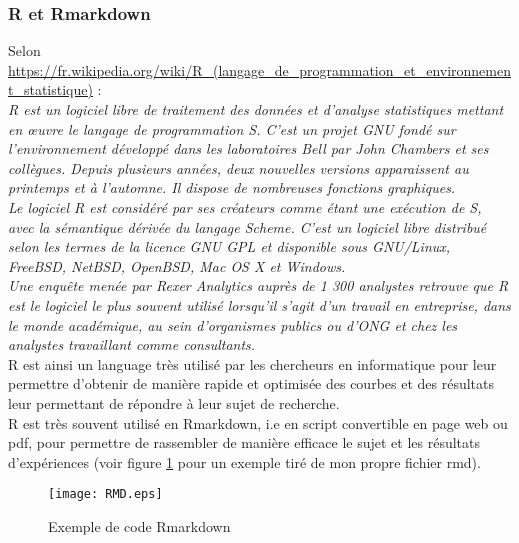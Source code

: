 \documentclass[a4paper,12pt]{article}
\begin{document}
{{	\subsubsection{R et Rmarkdown}
	\indent Selon \url{https://fr.wikipedia.org/wiki/R_(langage_de_programmation_et_environnement_statistique)} :\\
	\textit{R est un logiciel libre de traitement des donn\'e{}es et d'analyse statistiques mettant en \oe{}uvre le langage de programmation S. C'est un projet GNU fond\'e sur l'environnement d\'e{}velopp\'e dans les laboratoires Bell par John Chambers et ses coll\`egues. Depuis plusieurs ann\'e{}es, deux nouvelles versions apparaissent au printemps et à l'automne. Il dispose de nombreuses fonctions graphiques.\\
Le logiciel R est consid\'e{}r\'e par ses cr\'e{}ateurs comme \'e{}tant une ex\'e{}cution de S, avec la s\'e{}mantique d\'e{}riv\'e{}e du langage Scheme. C'est un logiciel libre distribu\'e{} selon les termes de la licence GNU GPL et disponible sous GNU/Linux, FreeBSD, NetBSD, OpenBSD, Mac OS X et Windows.\\
Une enqu\^ete men\'e{}e par Rexer Analytics aupr\`es de 1 300 analystes retrouve que R est le logiciel le plus souvent utilis\'e{} lorsqu'il s'agit d'un travail en entreprise, dans le monde acad\'e{}mique, au sein d'organismes publics ou d'ONG et chez les analystes travaillant comme consultants.}\\
    \indent R est ainsi un language tr\`es utilis\'e par les chercheurs en informatique pour leur permettre d'obtenir de mani\`ere rapide et optimis\'e{}e des courbes et des r\'e{}sultats leur permettant de r\'e{}pondre \`a leur sujet de recherche. \\
    R est tr\`es souvent utilis\'e en Rmarkdown, i.e en script convertible en page web ou pdf, pour permettre de rassembler de manière efficace le sujet et les r\'e{}sultats d'exp\'e{}riences (voir figure \ref{fig:rmd} pour un exemple tir\'e{} de mon propre fichier rmd).~
	\begin{figure}[!ht]
	    \centering
	    \caption{Exemple de code Rmarkdown}
	    \label{fig:rmd}
	    \texttt{[image: RMD.eps]}
	\end{figure}
}}
\end{document}
